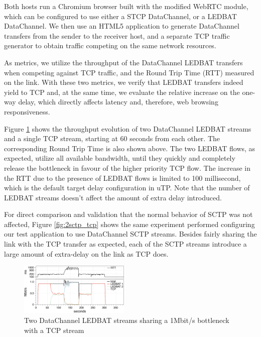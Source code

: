 \documentclass{sig-alternate}
\begin{document}
Both hosts run a Chromium browser built with the modified WebRTC module, which can be configured to use either a STCP DataChannel, or a LEDBAT DataChannel. We then use an HTML5 application to generate DataChannel transfers from the sender to the receiver host, and a separate TCP traffic generator to obtain traffic competing on the same network resources.

As metrics, we utilize the throughput of the DataChannel LEDBAT transfers when competing
against TCP traffic, and the Round Trip Time (RTT) measured on the link. With these two
metrics, we verify that LEDBAT transfers indeed yield to TCP and, at the same time, we
evaluate the relative increase on the one-way delay, which directly affects latency and,
therefore, web browsing responsiveness.

Figure \ref{fig:2ledbat_tcp} shows the throughput evolution of two DataChannel LEDBAT
streams and a single TCP stream, starting at 60 seconds from each other. The corresponding
Round Trip Time is also shown above. The two LEDBAT flows, as expected, utilize all
available bandwidth, until they quickly and completely release the bottleneck in favour of
the higher priority TCP flow. The increase in the RTT due to the presence of LEDBAT flows
is limited to 100 millisecond, which is the default target delay configuration in
uTP. Note that the number of LEDBAT streams doesn't affect the amount of extra delay
introduced.


For direct comparison and validation that the normal behavior of SCTP was not affected,
Figure \ref{fig:2sctp_tcp} shows the same experiment performed configuring our test
application to use DataChannel SCTP streams. Besides fairly sharing the link with the TCP
transfer as expected, each of the SCTP streams introduce a large amount of extra-delay on
the link as TCP does.

\begin{figure}[t]
  \centering
    \includegraphics[width=0.47\textwidth]{figs/2ledbat_tcp}
\vspace*{-0.38cm}
	\caption{Two DataChannel LEDBAT streams sharing a 1Mbit/s bottleneck with a TCP stream} \label{fig:2ledbat_tcp}
\end{figure}
\end{document}
